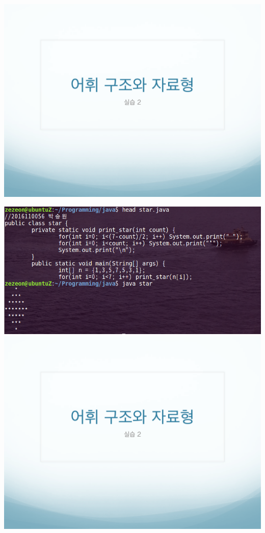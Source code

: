 \documentclass[12pt,a4paper]{article}
\begin{document}
\includegraphics[page=5, width=\textwidth]{2.pdf}

\includegraphics[width=\textwidth]{star.png}	
\includegraphics[page=6, width=\textwidth]{2.pdf}
\end{document}

